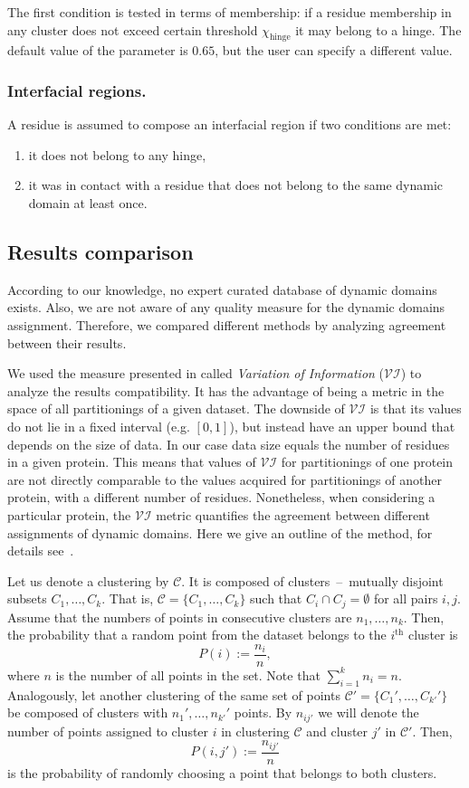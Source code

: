 The first condition is tested in terms of membership: if a residue membership in any cluster does not exceed certain threshold $\chi_\text{hinge}$ it may belong to a hinge. 
The default value of the parameter is $0.65$, but the user can specify a different value.

\subsubsection*{Interfacial regions.}
A residue is assumed to compose an interfacial region if two conditions are met:
\begin{enumerate}
\item it does not belong to any hinge,
\item it was in contact with a residue that does not belong to the same dynamic domain at least once.
\end{enumerate}

\subsection*{Results comparison}
According to our knowledge, no expert curated database of dynamic domains exists.
Also, we are not aware of any quality measure for the dynamic domains assignment.
Therefore, we compared different methods by analyzing agreement between their results.

We used the measure presented in \cite{meilua2007comparing} called \emph{Variation of Information} ($\mathcal{VI}$) to analyze the results compatibility.
It has the advantage of being a metric in the space of all partitionings of a given dataset.
The downside of $\mathcal{VI}$ is that its values do not lie in a fixed interval (e.g. $[0,1]$), but instead have an upper bound that depends on the size of data.
In our case data size equals the number of residues in a given protein.
This means that values of $\mathcal{VI}$ for partitionings of one protein are not directly comparable to the values acquired for partitionings of another protein, with a different number of residues.
Nonetheless, when considering a particular protein, the $\mathcal{VI}$ metric quantifies the agreement between different assignments of dynamic domains.
Here we give an outline of the method, for details see~\cite{meilua2007comparing}.

Let us denote a clustering by $\mathcal{C}$.
It is composed of clusters~--~mutually disjoint subsets $C_1,\ldots,C_k$.
That is, $\mathcal{C} = \{ C_1,\ldots,C_k\}$ such that \mbox{$C_i \cap C_j = \emptyset$} for all pairs $i,j$.
Assume that the numbers of points in consecutive clusters are $n_1,\ldots,n_k$.
Then, the probability that a random point from the dataset belongs to the $i^{\textrm{th}}$ cluster is $$P(i):=\frac{n_i}{n},$$ where $n$ is the number of all points in the set.
Note that $\sum_{i=1}^k n_i = n$.
Analogously, let another clustering of the same set of points $\mathcal{C'}=\{ C_1',\ldots,C_{k'}' \}$ be composed of clusters with $n_1',\ldots,n_{k'}'$ points.
By $n_{ij'}$ we will denote the number of points assigned to cluster $i$ in clustering $\mathcal{C}$ and cluster $j'$ in $\mathcal{C'}$.
Then, $$P(i,j'):=\frac{n_{ij'}}{n} $$ is the probability of randomly choosing a point that belongs to both clusters.

